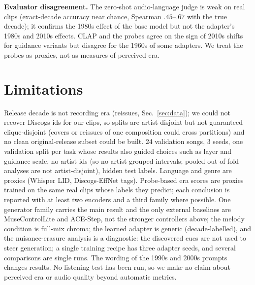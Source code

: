 \documentclass[10pt,twocolumn]{article}
\newcommand{\dP}{\Delta P}
\begin{document}
\begin{table}[t]\centering\footnotesize
\setlength{\tabcolsep}{2pt}
\caption{MERT $\dP$ (1960s / 1980s / 2010s) before and after erasing style and bandwidth nuisance directions (rank 19).}\label{tab:nuis}
\end{table}

\textbf{Evaluator disagreement.} The zero-shot audio-language judge is weak on real clips (exact-decade accuracy near chance, Spearman $.45$--$.67$ with the true decade); it confirms the 1980s effect of the base model but not the adapter's 1980s and 2010s effects. CLAP and the probes agree on the sign of 2010s shifts for guidance variants but disagree for the 1960s of some adapters. We treat the probes as proxies, not as measures of perceived era.

\section{Limitations}
Release decade is not recording era (reissues, Sec.~\ref{sec:data}); we could not recover Discogs ids for our clips, so splits are artist-disjoint but not guaranteed clique-disjoint (covers or reissues of one composition could cross partitions) and no clean original-release subset could be built. 24 validation songs, 3 seeds, one validation split per task whose results also guided choices such as layer and guidance scale, no artist ids (so no artist-grouped intervals; pooled out-of-fold analyses are not artist-disjoint), hidden test labels. Language and genre are proxies (Whisper LID, Discogs-EffNet tags). Probe-based era scores are proxies trained on the same real clips whose labels they predict; each conclusion is reported with at least two encoders and a third family where possible. One generator family carries the main result and the only external baselines are MuseControlLite and ACE-Step, not the stronger controllers above; the melody condition is full-mix chroma; the learned adapter is generic (decade-labelled), and the nuisance-erasure analysis is a diagnostic: the discovered cues are not used to steer generation; a single training recipe has three adapter seeds, and several comparisons are single runs. The wording of the 1990s and 2000s prompts changes results. No listening test has been run, so we make no claim about perceived era or audio quality beyond automatic metrics.
\end{document}

